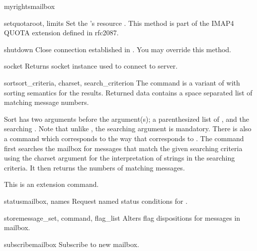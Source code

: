 \begin{methoddes}{myrights}{mailbox}
\begin{methoddesc}{setquota}{root, limits}
  Set the  's resource .
  This method is part of the IMAP4 QUOTA extension defined in rfc2087.
\end{methoddesc}

\begin{methoddesc}{shutdown}{}
  Close connection established in .
  You may override this method.
\end{methoddesc}

\begin{methoddesc}{socket}{}
  Returns socket instance used to connect to server.
\end{methoddesc}

\begin{methoddesc}{sort}{sort_criteria, charset, search_criterion}
  The  command is a variant of  with sorting semantics for
  the results.  Returned data contains a space
  separated list of matching message numbers.

  Sort has two arguments before the 
  argument(s); a parenthesized list of , and the searching .
  Note that unlike , the searching  argument is mandatory.
  There is also a  command which corresponds to  the way
  that  corresponds to .
  The  command first searches the mailbox for messages that
  match the given searching criteria using the charset argument for
  the interpretation of strings in the searching criteria.  It then
  returns the numbers of matching messages.

  This is an  extension command.
\end{methoddesc}

\begin{methoddesc}{status}{mailbox, names}
  Request named status conditions for . 
\end{methoddesc}

\begin{methoddesc}{store}{message_set, command, flag_list}
  Alters flag dispositions for messages in mailbox.
\end{methoddesc}

\begin{methoddesc}{subscribe}{mailbox}
  Subscribe to new mailbox.
\end{methoddesc}


\end{methoddes}
